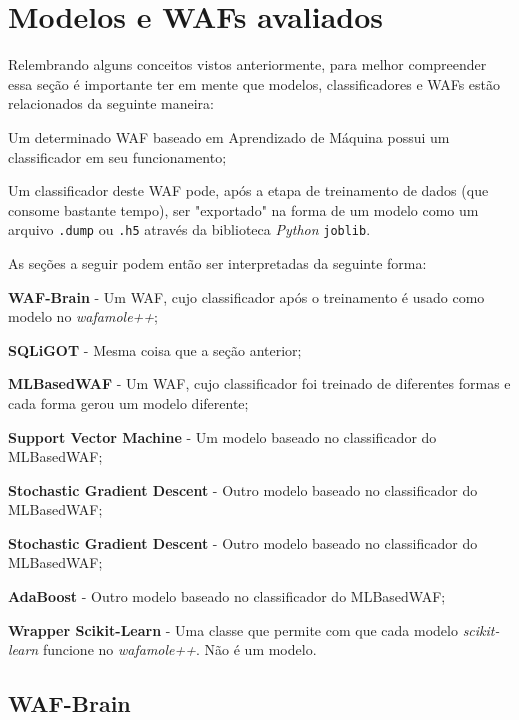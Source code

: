\bigskip

\section{Modelos e WAFs avaliados}

Relembrando alguns conceitos vistos anteriormente, para melhor compreender essa seção é importante ter em mente que modelos, classificadores e WAFs estão relacionados da seguinte maneira: 

\begin{alineas}
\item Um determinado WAF baseado em Aprendizado de Máquina possui um classificador em seu funcionamento;
\item Um classificador deste WAF pode, após a etapa de treinamento de dados (que consome bastante tempo), ser "exportado" na forma de um modelo como um arquivo \verb+.dump+ ou \verb+.h5+ através da biblioteca \textit{Python} \verb+joblib+.
\end{alineas}

As seções a seguir podem então ser interpretadas da seguinte forma:
\begin{alineas}
\item \textbf{WAF-Brain} - Um WAF, cujo classificador após o treinamento é usado como modelo no \textit{wafamole++};
\item \textbf{SQLiGOT} - Mesma coisa que a seção anterior;
\item \textbf{MLBasedWAF} - Um WAF, cujo classificador foi treinado de diferentes formas e cada forma gerou um modelo diferente;
\item \textbf{Support Vector Machine} - Um modelo baseado no classificador do MLBasedWAF;
\item \textbf{Stochastic Gradient Descent} - Outro modelo baseado no classificador do MLBasedWAF;
\item \textbf{Stochastic Gradient Descent} - Outro modelo baseado no classificador do MLBasedWAF;
\item \textbf{AdaBoost} - Outro modelo baseado no classificador do MLBasedWAF;
\item \textbf{Wrapper Scikit-Learn} - Uma classe que permite com que cada modelo \textit{scikit-learn} funcione no \textit{wafamole++}. Não é um modelo.
\end{alineas}
\subsection{WAF-Brain}

